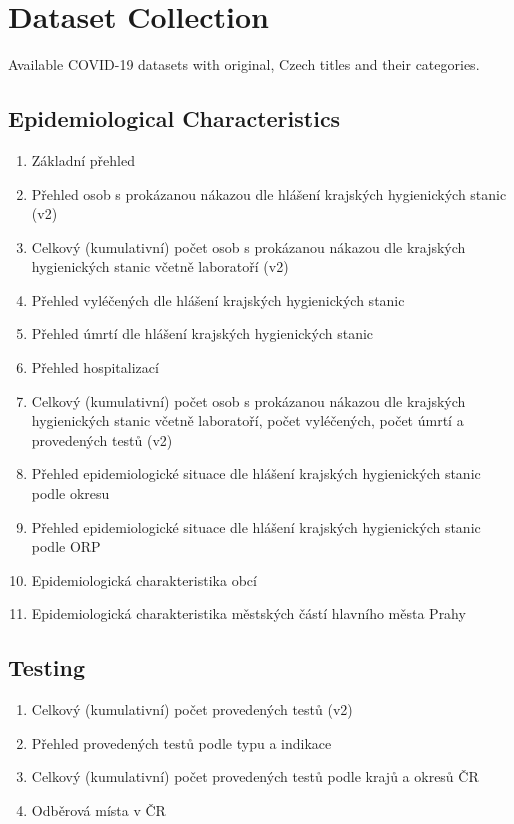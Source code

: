 \chapter{Dataset Collection}\label{ch:dataset-collection}

Available COVID-19 datasets with original, Czech titles and their categories.

\section{Epidemiological Characteristics}

\begin{enumerate}
    \item Základní přehled
    \item Přehled osob s prokázanou nákazou dle hlášení krajských hygienických stanic (v2)
    \item Celkový (kumulativní) počet osob s prokázanou nákazou dle krajských hygienických stanic včetně laboratoří (v2)
    \item Přehled vyléčených dle hlášení krajských hygienických stanic
    \item Přehled úmrtí dle hlášení krajských hygienických stanic
    \item Přehled hospitalizací
    \item Celkový (kumulativní) počet osob s prokázanou nákazou dle krajských hygienických stanic včetně laboratoří, počet vyléčených, počet úmrtí a provedených testů (v2)
    \item Přehled epidemiologické situace dle hlášení krajských hygienických stanic podle okresu
    \item Přehled epidemiologické situace dle hlášení krajských hygienických stanic podle ORP
    \item Epidemiologická charakteristika obcí
    \item Epidemiologická charakteristika městských částí hlavního města Prahy
\end{enumerate}

\section{Testing}

\begin{enumerate}
    \item Celkový (kumulativní) počet provedených testů (v2)
    \item Přehled provedených testů podle typu a indikace
    \item Celkový (kumulativní) počet provedených testů podle krajů a okresů ČR
    \item Odběrová místa v ČR
\end{enumerate}

